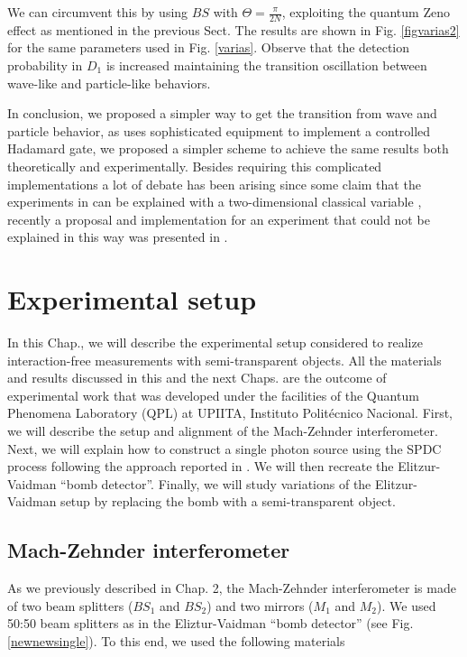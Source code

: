 \documentclass[12pt]{book}
\newcommand\blankpage{
    \null
    \thispagestyle{empty}
    \addtocounter{page}{0}
    \newpage
    }
\begin{document}
We can circumvent this by using $BS$ with $\Theta=\frac{\pi}{2N}$, exploiting the quantum Zeno effect as mentioned in the previous Sect. The results are shown in Fig. \ref{figvarias2} for the same parameters used in Fig. \ref{varias}. Observe that the detection probability in $D_{1}$ is increased maintaining the transition oscillation between wave-like and particle-like behaviors.
                  



In conclusion, we proposed a simpler way to get the transition from wave and particle behavior, as \cite{Kaiser2012,Peruzzo} uses sophisticated equipment to implement a controlled Hadamard gate, we proposed a simpler scheme to achieve the same results both theoretically and experimentally. Besides requiring this complicated implementations a lot of debate has been arising since some claim that the experiments in \cite{Peruzzo,Kaiser2012}  can be explained with a two-dimensional classical variable \cite{Rossi,Chaves}, recently a proposal and implementation for an experiment that could not be explained in this way was presented in \cite{Polino}.
\pagebreak
\blankpage


\chapter{Experimental setup}

In this Chap., we will describe the experimental setup considered to realize interaction-free measurements with semi-transparent objects. All the materials and results discussed in this and the next Chaps. are the outcome of experimental work that was developed under the facilities of the Quantum Phenomena Laboratory (QPL) at UPIITA, Instituto Politécnico Nacional. First, we will describe the setup and alignment of the Mach-Zehnder interferometer. Next, we will explain how to construct a single photon source using the SPDC process following the approach reported in \cite{maestria_procopio}. We will then recreate the Elitzur-Vaidman ``bomb detector''. Finally, we will study variations of the Elitzur-Vaidman setup by replacing the bomb with a semi-transparent object. 

\section{Mach-Zehnder interferometer}

As we previously described in Chap. 2, the Mach-Zehnder interferometer is made of two beam splitters ($BS_{1}$ and $BS_{2}$) and two mirrors ($M_{1}$ and $M_{2}$). We used 50:50 beam splitters as in the Eliztur-Vaidman ``bomb detector'' (see Fig. \ref{newnewsingle}). To this end, we  used the following materials
\end{document}
